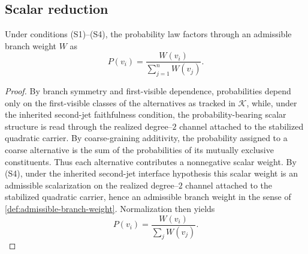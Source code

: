 \subsection{Scalar reduction}
\begin{lemma}
	\label{lem:scalar-reduction}
	Under conditions \textup{(S1)--(S4)}, the probability law factors
	through an admissible branch weight \(W\) as
	\[
		P(v_i)=\frac{W(v_i)}{\sum_{j=1}^n W(v_j)}.
	\]
\end{lemma}
\begin{proof}
	By branch symmetry and first-visible dependence, probabilities
	depend only on the first-visible classes of the alternatives as
	tracked in \(\mathcal K\), while, under the inherited second-jet faithfulness condition, the probability-bearing scalar structure is
	read through the realized degree--\(2\) channel attached to the
	stabilized quadratic carrier.
	By coarse-graining additivity, the probability assigned to a coarse
	alternative is the sum of the probabilities of its mutually exclusive
	constituents.  Thus each alternative contributes a nonnegative scalar
	weight.
	By \textup{(S4)}, under the inherited second-jet interface
	hypothesis this scalar weight is an admissible scalarization on the
	realized degree--\(2\) channel attached to the stabilized quadratic
	carrier, hence an admissible branch weight in the sense of
	\cref{def:admissible-branch-weight}.
	Normalization then yields
	\[
		P(v_i)=\frac{W(v_i)}{\sum_j W(v_j)}.
	\]
\end{proof}
